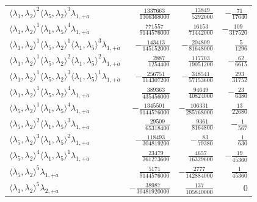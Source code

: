 \begin{longtable}{@{}lrrr@{}}
$\langle\lambda_1,\lambda_2\rangle^{2}\langle\lambda_5,\lambda_2\rangle^{3}\lambda_{1,+\dot a}$ & $\frac{1337663}{1306368000}$ & $\frac{13849}{5292000}$ & $-\frac{71}{17640}$ \\
$\langle\lambda_1,\lambda_2\rangle^{1}\langle\lambda_1,\lambda_5\rangle^{4}\lambda_{1,+\dot a}$ & $\frac{771557}{9144576000}$ & $\frac{16153}{71442000}$ & $-\frac{109}{317520}$ \\
$\langle\lambda_1,\lambda_2\rangle^{1}\langle\lambda_5,\lambda_2\rangle^{1}\langle\lambda_1,\lambda_5\rangle^{3}\lambda_{1,+\dot a}$ & $-\frac{143413}{145152000}$ & $-\frac{204809}{81648000}$ & $\frac{5}{1296}$ \\
$\langle\lambda_1,\lambda_2\rangle^{1}\langle\lambda_5,\lambda_2\rangle^{2}\langle\lambda_1,\lambda_5\rangle^{2}\lambda_{1,+\dot a}$ & $\frac{2887}{1254400}$ & $\frac{117703}{19051200}$ & $-\frac{62}{6615}$ \\
$\langle\lambda_1,\lambda_2\rangle^{1}\langle\lambda_5,\lambda_2\rangle^{3}\langle\lambda_1,\lambda_5\rangle^{1}\lambda_{1,+\dot a}$ & $-\frac{256751}{114307200}$ & $-\frac{348541}{57153600}$ & $\frac{293}{31752}$ \\
$\langle\lambda_1,\lambda_2\rangle^{1}\langle\lambda_5,\lambda_2\rangle^{4}\lambda_{1,+\dot a}$ & $\frac{389363}{435456000}$ & $\frac{94649}{40824000}$ & $-\frac{23}{6480}$ \\
$\langle\lambda_5,\lambda_2\rangle^{1}\langle\lambda_1,\lambda_5\rangle^{4}\lambda_{1,+\dot a}$ & $-\frac{1345501}{9144576000}$ & $-\frac{106331}{285768000}$ & $\frac{13}{22680}$ \\
$\langle\lambda_5,\lambda_2\rangle^{2}\langle\lambda_1,\lambda_5\rangle^{3}\lambda_{1,+\dot a}$ & $\frac{29509}{65318400}$ & $\frac{9361}{8164800}$ & $-\frac{1}{567}$ \\
$\langle\lambda_5,\lambda_2\rangle^{3}\langle\lambda_1,\lambda_5\rangle^{2}\lambda_{1,+\dot a}$ & $-\frac{118493}{304819200}$ & $-\frac{83}{79380}$ & $\frac{1}{630}$ \\
$\langle\lambda_5,\lambda_2\rangle^{4}\langle\lambda_1,\lambda_5\rangle^{1}\lambda_{1,+\dot a}$ & $\frac{23479}{261273600}$ & $\frac{4657}{16329600}$ & $-\frac{19}{45360}$ \\
$\langle\lambda_5,\lambda_2\rangle^{5}\lambda_{1,+\dot a}$ & $\frac{5171}{9144576000}$ & $-\frac{2777}{142884000}$ & $\frac{1}{45360}$ \\
$\langle\lambda_1,\lambda_2\rangle^{5}\lambda_{2,+\dot a}$ & $-\frac{38987}{30481920000}$ & $\frac{137}{105840000}$ & $0$ \\

\end{longtable}
